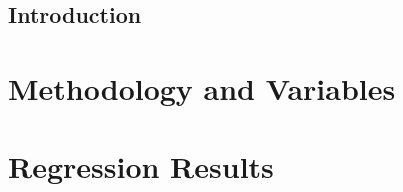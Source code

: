 \documentclass[UTF8, aspectratio=169 , 10pt，punct=kaiming]{beamer} %
\begin{document}
\subsection{Introduction}


\section{Methodology and Variables}



\section{Regression Results}

\section{\appendixname}













\end{document}
